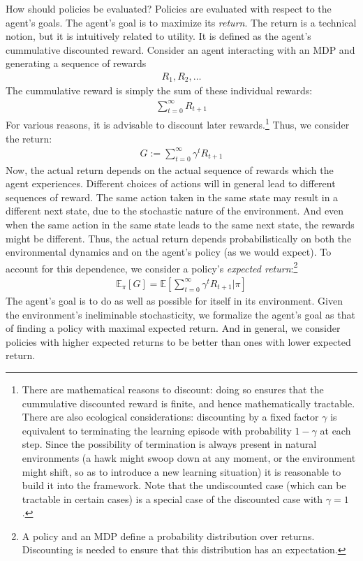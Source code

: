 How should policies be evaluated?
Policies are evaluated with respect to the agent's goals.
The agent's goal is to maximize its \emph{return}.
The return is a technical notion, but it is intuitively related to utility.
It is defined as the agent's cummulative discounted reward.
Consider an agent interacting with an MDP and generating a sequence of rewards
\begin{align*}
	R_1, R_2, \dots
\end{align*}
The cummulative reward is simply the sum of these individual rewards:
\begin{align*}
	\sum_{t = 0}^\infty R_{t + 1}
\end{align*}
For various reasons, it is advisable to discount later rewards.\footnote{There are mathematical reasons to discount: doing so ensures that the cummulative discounted reward is finite, and hence mathematically tractable.
There are also ecological considerations: discounting by a fixed factor $\gamma$ is equivalent to terminating the learning episode with probability $1 - \gamma$ at each step.
Since the possibility of termination is always present in natural environments (a hawk might swoop down at any moment, or the environment might shift, so as to introduce a new learning situation) it is reasonable to build it into the framework.
Note that the undiscounted case (which can be tractable in certain cases) is a special case of the discounted case with $\gamma = 1$.
}
Thus, we consider the return:
\begin{align*}
	G := \sum_{t = 0}^\infty \gamma^t R_{t + 1}
\end{align*}
Now, the actual return depends on the actual sequence of rewards which the agent experiences.
Different choices of actions will in general lead to different sequences of reward.
The same action taken in the same state may result in a different next state, due to the stochastic nature of the environment.
And even when the same action in the same state leads to the same next state, the rewards might be different.
Thus, the actual return depends probabilistically on both the environmental dynamics and on the agent's policy (as we would expect).
To account for this dependence, we consider a policy's \emph{expected return}:\footnote{A policy and an MDP define a probability distribution over returns. Discounting is needed to ensure that this distribution has an expectation.}
\begin{align*}
	\mathbb E_\pi [G] = \mathbb E \left [ \sum_{t = 0}^\infty \gamma^t R_{t + 1} | \pi \right ]
\end{align*}
The agent's goal is to do as well as possible for itself in its environment.
Given the environment's ineliminable stochasticity, we formalize the agent's goal as that of finding a policy with maximal expected return.
And in general, we consider policies with higher expected returns to be better than ones with lower expected return.

